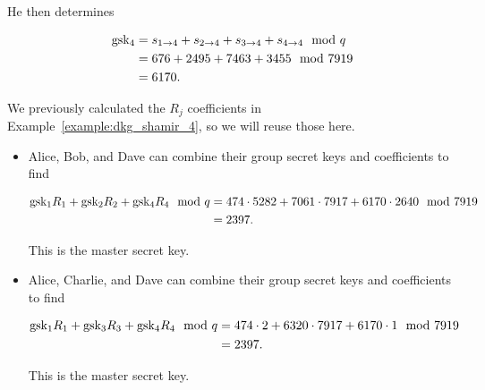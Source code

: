 \begin{example}
\begin{itemize}
He then determines

\begin{align}
    \textrm{gsk}{}_{4} &= s_{1\to 4} + s_{2\to 4} + s_{3\to 4} + s_{4\to 4} \mod q
        \nonumber\\
    &= 676 + 2495 + 7463 + 3455 \mod 7919
        \nonumber\\
    &= 6170.
\end{align}
\end{itemize}

We previously calculated the $R_{j}$ coefficients
in Example~\ref{example:dkg_shamir_4}, so we will reuse those here.

\begin{itemize}
\item Alice, Bob, and Dave can combine their group secret keys
    and coefficients to find

\begin{align}
    \textrm{gsk}{}_{1}R_{1} + \textrm{gsk}{}_{2}R_{2} + \textrm{gsk}{}_{4}R_{4} \mod q
            &= 474\cdot5282 + 7061\cdot7917 + 6170\cdot2640 \mod 7919
            \nonumber\\
        &= 2397.
\end{align}

This is the master secret key.

\item Alice, Charlie, and Dave can combine their group secret keys
    and coefficients to find

\begin{align}
    \textrm{gsk}{}_{1}R_{1} + \textrm{gsk}{}_{3}R_{3} + \textrm{gsk}{}_{4}R_{4} \mod q
            &= 474\cdot2 + 6320\cdot7917 + 6170\cdot1 \mod 7919
            \nonumber\\
        &= 2397.
\end{align}

This is the master secret key.
\end{itemize}
\end{example}
